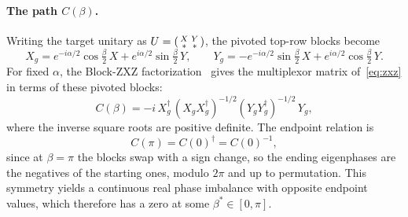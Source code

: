 \documentclass[11pt]{article}
\begin{document}
\paragraph{The path $C(\beta)$.} Writing the target unitary as $U=\begin{psmallmatrix}X&Y\\ \ast&\ast\end{psmallmatrix}$, the pivoted top-row blocks become
\begin{equation}\label{eq:path}
X_g=e^{-i\alpha/2}\cos\tfrac\beta2\,X+e^{i\alpha/2}\sin\tfrac\beta2\,Y,\qquad
Y_g=-e^{-i\alpha/2}\sin\tfrac\beta2\,X+e^{i\alpha/2}\cos\tfrac\beta2\,Y .
\end{equation}
For fixed $\alpha$, the Block-ZXZ factorization~\cite[Sec.~4.1]{zxz} gives the
multiplexor matrix of~\eqref{eq:zxz} in terms of these pivoted blocks:
\begin{equation}\label{eq:Cdef}
C(\beta)=-i\,X_g^\dagger\,(X_gX_g^\dagger)^{-1/2}(Y_gY_g^\dagger)^{-1/2}\,Y_g,
\end{equation}
where the inverse square roots are positive definite. 
The endpoint relation is
\begin{equation}\label{eq:inv}
C(\pi)=C(0)^\dagger=C(0)^{-1},
\end{equation}
since at $\beta=\pi$ the blocks swap with a sign change, so the ending eigenphases are the negatives of the starting ones, modulo $2\pi$ and up to permutation. 
This symmetry yields a continuous real phase imbalance with opposite endpoint values, which therefore has a zero at some $\beta^\ast\in[0,\pi]$.
\end{document}
